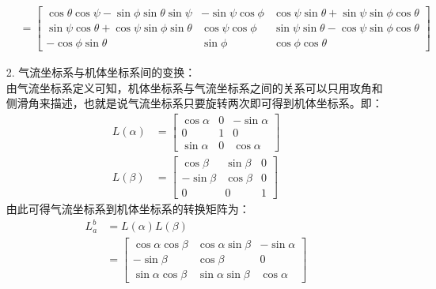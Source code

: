 \begin{itemize}
\begin{align}
    &= \begin{bmatrix}
     \cos \theta\cos \psi -\sin \phi \sin \theta \sin \psi&  -\sin\psi\cos\phi& \cos\psi\sin\theta+\sin\psi\sin\phi\cos\theta  \\
     \sin\psi\cos\theta+\cos\psi\sin\phi\sin\theta&  \cos\psi\cos\phi& \sin\psi\sin\theta-\cos\psi\sin\phi\cos\theta\\
      -\cos\phi\sin\theta&  \sin\phi& \cos\phi\cos\theta
    \end{bmatrix}
\end{align}
\item [2.] 气流坐标系与机体坐标系间的变换：\\
由气流坐标系定义可知，机体坐标系与气流坐标系之间的关系可以只用攻角和侧滑角来描述，也就是说气流坐标系只要旋转两次即可得到机体坐标系。即：
\begin{align}
    L(\alpha)&=
    \begin{bmatrix}
      \cos\alpha&  0& -\sin\alpha\\
      0&  1& 0\\
      \sin\alpha &  0& \cos\alpha 
    \end{bmatrix} \\
    L(\beta)&=
    \begin{bmatrix}
      \cos\beta&  \sin\beta& 0\\
      -\sin\beta&  \cos\beta& 0\\
      0 &  0& 1 
    \end{bmatrix}
\end{align}
由此可得气流坐标系到机体坐标系的转换矩阵为：
\begin{align}
    L_{a}^{b}&= L(\alpha)L(\beta) \nonumber \\
    &=
    \begin{bmatrix}
      \cos\alpha\cos\beta&  \cos\alpha\sin\beta& -\sin\alpha\\
      -\sin\beta&  \cos\beta& 0\\
      \sin\alpha\cos\beta &  \sin\alpha\sin\beta& \cos\alpha 
    \end{bmatrix} 
    \label{eq:Lab}
\end{align}
\end{itemize}                                         
